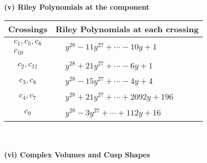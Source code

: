 \documentclass[1p]{elsarticle_modified}
\theoremstyle{definition}
\begin{document}
\newpage\renewcommand{\arraystretch}{1}
\flushleft \textbf{(v) Riley Polynomials at the component}\newline \\
\begin{tabular}{m{50pt}|m{274pt}}
Crossings & \hspace{64pt}Riley Polynomials at each crossing \\
\hline $$\begin{aligned}c_{1},c_{5},c_{6}\\c_{10}\end{aligned}$$&$\begin{aligned}
&y^{28}-11 y^{27}+\cdots-10 y+1
\end{aligned}$\\
\hline $$\begin{aligned}c_{2},c_{11}\end{aligned}$$&$\begin{aligned}
&y^{28}+21 y^{27}+\cdots-6 y+1
\end{aligned}$\\
\hline $$\begin{aligned}c_{3},c_{8}\end{aligned}$$&$\begin{aligned}
&y^{28}-15 y^{27}+\cdots-4 y+4
\end{aligned}$\\
\hline $$\begin{aligned}c_{4},c_{7}\end{aligned}$$&$\begin{aligned}
&y^{28}+21 y^{27}+\cdots+2092 y+196
\end{aligned}$\\
\hline $$\begin{aligned}c_{9}\end{aligned}$$&$\begin{aligned}
&y^{28}-3 y^{27}+\cdots+112 y+16
\end{aligned}$\\
\hline
\end{tabular}\\~\\
\newpage\flushleft \textbf{(vi) Complex Volumes and Cusp Shapes}
\end{document}
